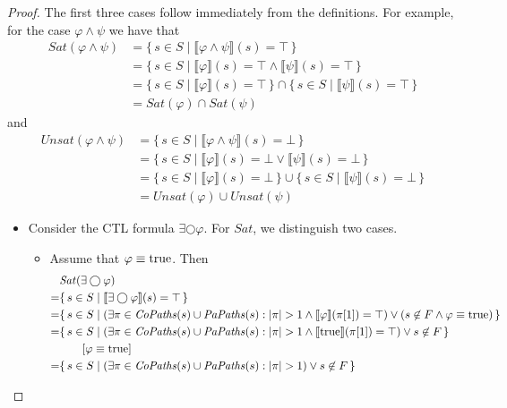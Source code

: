 \documentclass[12pt]{article}
\newcommand{\nxt}{\bigcirc}
\newcommand{\TRUE}{\mbox{\lstinline{true}}}
\theoremstyle{definition}
\newcommand{\comment}[1]{\hspace{2em}[\mbox{#1}]}
\newcommand{\satisfaction}[1]{\llbracket #1 \rrbracket}
\newcommand{\bottom}{\mathord{\perp}}
\newenvironment{franck}{\color{red}}{\color{black}}
\begin{document}
\begin{proof}
The first three cases follow immediately from the definitions.  For example, for the case $\varphi \wedge \psi$ we have that
\begin{align*}
\mathit{Sat}(\varphi \wedge \psi) 
& = \{\, s \in S \mid \satisfaction{\varphi \wedge \psi}(s) = \top \,\}\\
& = \{\, s \in S \mid \satisfaction{\varphi}(s) = \top \wedge \satisfaction{\psi}(s) = \top \,\}\\
& = \{\, s \in S \mid \satisfaction{\varphi}(s) = \top \,\} \cap \{\, s \in S \mid \satisfaction{\psi}(s) = \top \,\}\\
& = \mathit{Sat}(\varphi) \cap \mathit{Sat}(\psi)
\end{align*}
and
\begin{align*}
\mathit{Unsat}(\varphi \wedge \psi) 
& = \{\, s \in S \mid \satisfaction{\varphi \wedge \psi}(s) = \bottom \,\}\\
& = \{\, s \in S \mid \satisfaction{\varphi}(s) = \bottom \vee \satisfaction{\psi}(s) = \bottom \,\}\\
& = \{\, s \in S \mid \satisfaction{\varphi}(s) = \bottom \,\} \cup \{\, s \in S \mid \satisfaction{\psi}(s) = \bottom \,\}\\
& = \mathit{Unsat}(\varphi) \cup \mathit{Unsat}(\psi)
\end{align*}
\begin{itemize}
\item 
\begin{franck}
Consider the CTL formula $\exists \nxt \varphi$.  
For $\mathit{Sat}$, we distinguish two cases.
\begin{itemize}
\item 
Assume that $\varphi \equiv \TRUE$.  Then
\begin{align*}
& \mathit{Sat}(\exists \nxt \varphi)\\
= & \{\, s \in S \mid \satisfaction{\exists \nxt \varphi}(s) = \top \,\}\\
= & \{\, s \in S \mid (\exists \pi \in \mathit{CoPaths}(s) \cup \mathit{PaPaths}(s) : |\pi| > 1 \wedge \satisfaction{\varphi}(\pi[1]) = \top) \vee (s \not\in F \wedge \varphi \equiv \TRUE) \,\}\\
= & \{\, s \in S \mid (\exists \pi \in \mathit{CoPaths}(s) \cup \mathit{PaPaths}(s) : |\pi| > 1 \wedge \satisfaction{\TRUE}(\pi[1]) = \top) \vee s \not\in F \,\}\\
& \comment{$\varphi \equiv \TRUE$}\\
= & \{\, s \in S \mid (\exists \pi \in \mathit{CoPaths}(s) \cup \mathit{PaPaths}(s) : |\pi| > 1) \vee s \not\in F \,\}\\

\end{align*}
\end{itemize}
\end{franck}
\end{itemize}
\end{proof}
\end{document}
